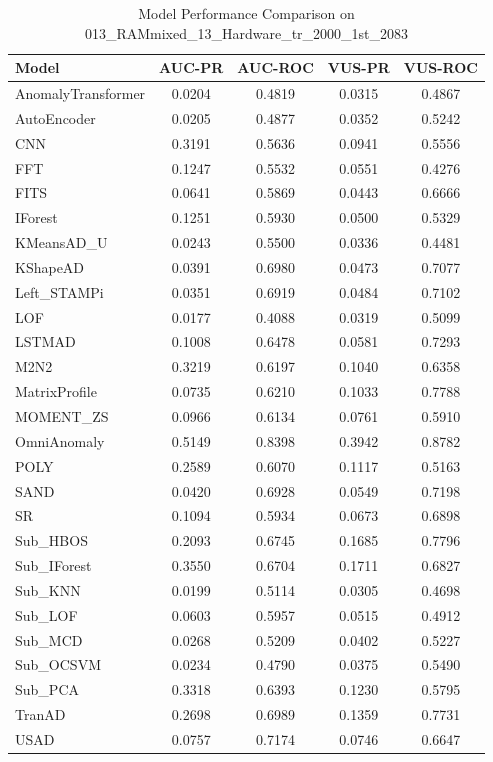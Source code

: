 \documentclass[12pt,oneside]{article}
\begin{document}
\begin{table}[H]
    \centering
    \caption{Model Performance Comparison on 013\_RAMmixed\_13\_Hardware\_tr\_2000\_1st\_2083}
    \begin{tabular}{|l|c|c|c|c|}
        \toprule
        \textbf{Model} & \textbf{AUC-PR} & \textbf{AUC-ROC} & \textbf{VUS-PR} & \textbf{VUS-ROC} \\
        \midrule
        AnomalyTransformer & 0.0204 & 0.4819 & 0.0315 & 0.4867 \\
        AutoEncoder & 0.0205 & 0.4877 & 0.0352 & 0.5242 \\
        CNN & 0.3191 & 0.5636 & 0.0941 & 0.5556 \\
        FFT & 0.1247 & 0.5532 & 0.0551 & 0.4276 \\
        FITS & 0.0641 & 0.5869 & 0.0443 & 0.6666 \\
        IForest & 0.1251 & 0.5930 & 0.0500 & 0.5329 \\
        KMeansAD\_U & 0.0243 & 0.5500 & 0.0336 & 0.4481 \\
        KShapeAD & 0.0391 & 0.6980 & 0.0473 & 0.7077 \\
        Left\_STAMPi & 0.0351 & 0.6919 & 0.0484 & 0.7102 \\
        LOF & 0.0177 & 0.4088 & 0.0319 & 0.5099 \\
        LSTMAD & 0.1008 & 0.6478 & 0.0581 & 0.7293 \\
        M2N2 & 0.3219 & 0.6197 & 0.1040 & 0.6358 \\
        MatrixProfile & 0.0735 & 0.6210 & 0.1033 & 0.7788 \\
        MOMENT\_ZS & 0.0966 & 0.6134 & 0.0761 & 0.5910 \\
        OmniAnomaly & 0.5149 & 0.8398 & 0.3942 & 0.8782 \\
        POLY & 0.2589 & 0.6070 & 0.1117 & 0.5163 \\
        SAND & 0.0420 & 0.6928 & 0.0549 & 0.7198 \\
        SR & 0.1094 & 0.5934 & 0.0673 & 0.6898 \\
        Sub\_HBOS & 0.2093 & 0.6745 & 0.1685 & 0.7796 \\
        Sub\_IForest & 0.3550 & 0.6704 & 0.1711 & 0.6827 \\
        Sub\_KNN & 0.0199 & 0.5114 & 0.0305 & 0.4698 \\
        Sub\_LOF & 0.0603 & 0.5957 & 0.0515 & 0.4912 \\
        Sub\_MCD & 0.0268 & 0.5209 & 0.0402 & 0.5227 \\
        Sub\_OCSVM & 0.0234 & 0.4790 & 0.0375 & 0.5490 \\
        Sub\_PCA & 0.3318 & 0.6393 & 0.1230 & 0.5795 \\
        TranAD & 0.2698 & 0.6989 & 0.1359 & 0.7731 \\
        USAD & 0.0757 & 0.7174 & 0.0746 & 0.6647 \\
        \bottomrule
    \end{tabular}

    \label{tab:model_performance_RAMmixed}
\end{table}
\end{document}
